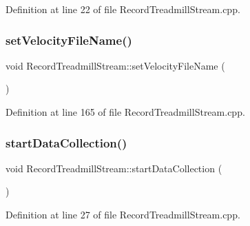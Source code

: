 Definition at line 22 of file Record\+Treadmill\+Stream.\+cpp.

\mbox{\label{class_record_treadmill_stream_a8160b81706a250149d14680700bc5b85}} 
\subsubsection{\texorpdfstring{set\+Velocity\+File\+Name()}{setVelocityFileName()}}
{\footnotesize\ttfamily void Record\+Treadmill\+Stream\+::set\+Velocity\+File\+Name (\begin{DoxyParamCaption}{ }\end{DoxyParamCaption})}



Definition at line 165 of file Record\+Treadmill\+Stream.\+cpp.

\mbox{\label{class_record_treadmill_stream_a058913f2f5796ef722ee0270382cf5a4}} 
\subsubsection{\texorpdfstring{start\+Data\+Collection()}{startDataCollection()}}
{\footnotesize\ttfamily void Record\+Treadmill\+Stream\+::start\+Data\+Collection (\begin{DoxyParamCaption}{ }\end{DoxyParamCaption})}



Definition at line 27 of file Record\+Treadmill\+Stream.\+cpp.

